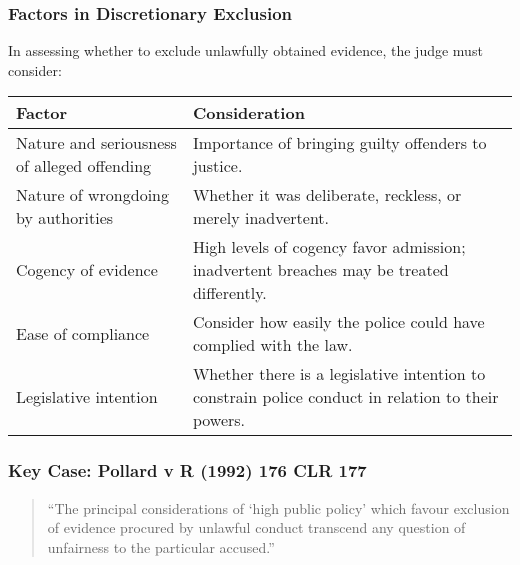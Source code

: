 \subsubsection{Factors in Discretionary
Exclusion}\label{factors-in-discretionary-exclusion}

In assessing whether to exclude unlawfully obtained evidence, the judge
must consider:

\begin{longtable}[]{@{}
  >{\raggedright\arraybackslash}p{}
  >{\raggedright\arraybackslash}p{}@{}}
\toprule\noalign{}
\begin{minipage}[b]{\linewidth}\raggedright
Factor
\end{minipage} & \begin{minipage}[b]{\linewidth}\raggedright
Consideration
\end{minipage} \\
\midrule\noalign{}
\endhead
\bottomrule\noalign{}
\endlastfoot
Nature and seriousness of alleged offending & Importance of bringing
guilty offenders to justice. \\
Nature of wrongdoing by authorities & Whether it was deliberate,
reckless, or merely inadvertent. \\
Cogency of evidence & High levels of cogency favor admission;
inadvertent breaches may be treated differently. \\
Ease of compliance & Consider how easily the police could have complied
with the law. \\
Legislative intention & Whether there is a legislative intention to
constrain police conduct in relation to their powers. \\
\end{longtable}

\subsubsection{\texorpdfstring{Key Case: \textbf{Pollard v R (1992) 176
CLR
177}}{Key Case: Pollard v R (1992) 176 CLR 177}}\label{key-case-pollard-v-r-1992-176-clr-177}

\begin{quote}
``The principal considerations of `high public policy' which favour
exclusion of evidence procured by unlawful conduct transcend any
question of unfairness to the particular accused.''
\end{quote}

